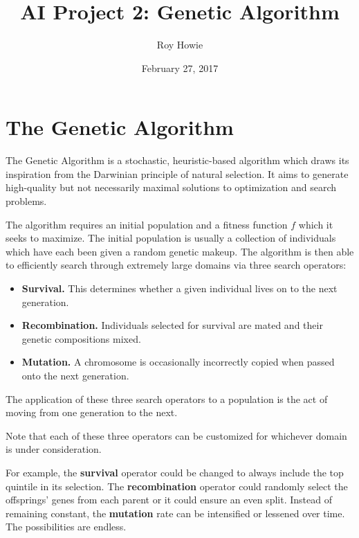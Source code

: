 \documentclass{article}
\begin{document}
\title{AI Project 2: Genetic Algorithm}
\author{Roy Howie}
\date{February 27, 2017}
\maketitle


\section{The Genetic Algorithm}
  The Genetic Algorithm is a stochastic, heuristic-based algorithm which draws
  its inspiration from the Darwinian principle of natural selection. It aims to
  generate high-quality but not necessarily maximal solutions to optimization
  and search problems.

  The algorithm requires an initial population and a fitness function $f$ which
  it seeks to maximize. The initial population is usually a collection of
  individuals which have each been given a random genetic makeup. The algorithm
  is then able to efficiently search through extremely large domains via three
  search operators:
  \begin{itemize}
    \renewcommand\labelitemi{}
    \item{
      \textbf{Survival.} This determines whether a given individual lives on to
      the next generation.
    }
    \item{
      \textbf{Recombination.} Individuals selected for survival are mated and
      their genetic compositions mixed.
    }
    \item{
      \textbf{Mutation.} A chromosome is occasionally incorrectly copied when
      passed onto the next generation.
    }
  \end{itemize}
  The application of these three search operators to a population is the act of
  moving from one generation to the next.

  Note that each of these three operators can be customized for whichever domain
  is under consideration.

  For example, the \textbf{survival} operator could be changed to always include
  the top quintile in its selection. The \textbf{recombination} operator could
  randomly select the offsprings' genes from each parent or it could ensure an
  even split. Instead of remaining constant, the \textbf{mutation} rate can be
  intensified or lessened over time. The possibilities are endless.
\end{document}
